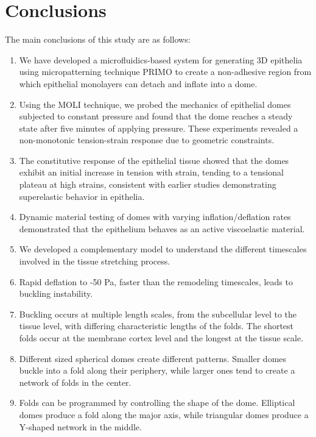 
\hypertarget{conclusions}{%
	\section{Conclusions}\label{conclusions}}

The main conclusions of this study are as follows:

\begin{enumerate}
	\def\labelenumi{\arabic{enumi}.}
	\item We have developed a microfluidics-based system for generating 3D epithelia using micropatterning technique PRIMO to create a non-adhesive region from which epithelial monolayers can detach and inflate into a dome.
	\item Using the MOLI technique, we probed the mechanics of epithelial domes subjected to constant pressure and found that the dome reaches a steady state after five minutes of applying pressure. These experiments revealed a non-monotonic tension-strain response due to geometric constraints.
	\item The constitutive response of the epithelial tissue showed that the domes exhibit an initial increase in tension with strain, tending to a tensional plateau at high strains, consistent with earlier studies demonstrating superelastic behavior in epithelia.
	\item Dynamic material testing of domes with varying inflation/deflation rates demonstrated that the epithelium behaves as an active viscoelastic material.
	\item We developed a complementary model to understand the different timescales involved in the tissue stretching process.
	\item Rapid deflation to -50 Pa, faster than the remodeling timescales, leads to buckling instability.
	\item Buckling occurs at multiple length scales, from the subcellular level to the tissue level, with differing characteristic lengths of the folds. The shortest folds occur at the membrane cortex level and the longest at the tissue scale.
	\item Different sized spherical domes create different patterns. Smaller domes buckle into a fold along their periphery, while larger ones tend to create a network of folds in the center.
	\item Folds can be programmed by controlling the shape of the dome. Elliptical domes produce a fold along the major axis, while triangular domes produce a Y-shaped network in the middle.
\end{enumerate}

